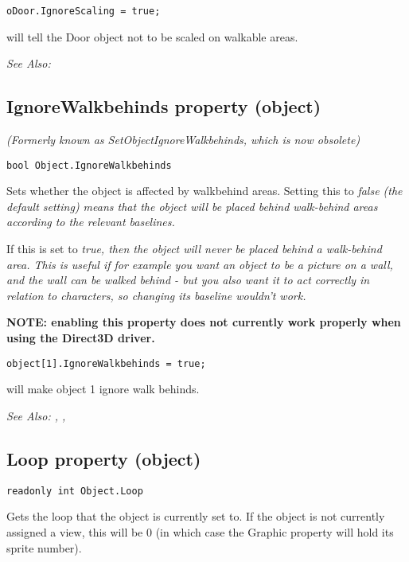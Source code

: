 \begin{verbatim}
oDoor.IgnoreScaling = true;
\end{verbatim}
will tell the Door object not to be scaled on walkable areas.

\it{See Also:} 


\subsection{IgnoreWalkbehinds property (object)}\label{Object.IgnoreWalkbehinds}%

\it{(Formerly known as SetObjectIgnoreWalkbehinds, which is now obsolete)}

\begin{verbatim}
bool Object.IgnoreWalkbehinds
\end{verbatim}
Sets whether the object is affected by walkbehind areas. Setting this to \it{false}
(the default setting) means that the object will be placed behind walk-behind
areas according to the relevant baselines.

If this is set to \it{true}, then the object will never be placed behind a walk-behind
area. This is useful if for example you want an object to be a picture on
a wall, and the wall can be walked behind - but you also want it to act
correctly in relation to characters, so changing its baseline wouldn't work.

\bf{NOTE:} enabling this property does not currently work properly when using
the Direct3D driver.

\begin{verbatim}
object[1].IgnoreWalkbehinds = true;
\end{verbatim}
will make object 1 ignore walk behinds.


\it{See Also:} ,
, 


\subsection{Loop property (object)}\label{Object.Loop}%

\begin{verbatim}
readonly int Object.Loop
\end{verbatim}
Gets the loop that the object is currently set to. If the object is not currently
assigned a view, this will be 0 (in which case the Graphic property will
hold its sprite number).

